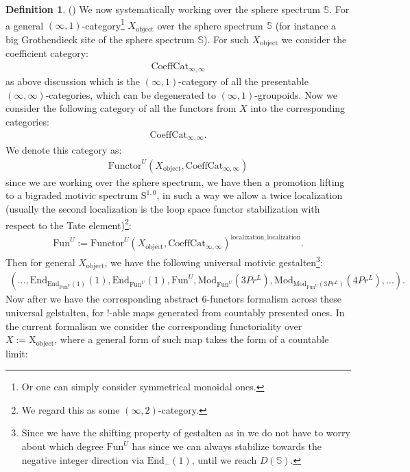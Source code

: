 \documentclass[12pt]{article}
\theoremstyle{definition}
\newtheorem{definition}{Definition}
\begin{document}
\begin{definition}()
We now systematically working over the sphere spectrum $\mathbb{S}$. For a general $(\infty,1)$-category\footnote{Or one can simply consider symmetrical monoidal ones.} $X_\mathrm{object}$ over the sphere spectrum $\mathbb{S}$ (for instance a big Grothendieck site of the sphere spectrum $\mathbb{S}$). For such $X_\mathrm{object}$ we consider the coefficient category:
\begin{align}
\mathrm{CoeffCat}_{\infty,\infty}
\end{align}
as above discussion which is the $(\infty,1)$-category of all the presentable $(\infty,\infty)$-categories, which can be degenerated to $(\infty,1)$-groupoids. Now we consider the following category of all the functors from $X$ into the corresponding categories:
\begin{align}
\mathrm{CoeffCat}_{\infty,\infty}.
\end{align}
We denote this category as:
\begin{align}
\mathrm{Functor}^U(X_\mathrm{object},\mathrm{CoeffCat}_{\infty,\infty})
\end{align}
since we are working over the sphere spectrum, we have then a promotion lifting to a bigraded motivic spectrum $\mathrm{S}^{1,0}$, in such a way we allow a twice localization (usually the second localization is the loop space functor stabilization with respect to the Tate element)\footnote{We regard this as some $(\infty,2)$-category.}:
\begin{align}
\mathrm{Fun}^U:=\mathrm{Functor}^U(X_\mathrm{object},\mathrm{CoeffCat}_{\infty,\infty})^{\mathrm{localization}, \mathrm{localization}}.
\end{align}
Then for general $X_\mathrm{object}$, we have the following universal motivic gestalten\footnote{Since we have the shifting property of gestalten as in \cite{5S5} we do not have to worry about which degree $\mathrm{Fun}^U$ has since we can always stabilize towards the negative integer direction via $\mathrm{End}_{-}(1)$, until we reach $D(\mathbb{S})$.}:
\begin{align}
(...,\mathrm{End}_{\mathrm{End}_{\mathrm{Fun}^U}(1)}(1),\mathrm{End}_{\mathrm{Fun}^U}(1),\mathrm{Fun}^U,\mathrm{Mod}_{\mathrm{Fun}^U}(3Pr^L),\mathrm{Mod}_{\mathrm{Mod}_{\mathrm{Fun}^U}(3Pr^L)}(4Pr^L),...).
\end{align}
Now after \cite{5S5} we have the corresponding abstract 6-functors formalism across these universal gelstalten, for $!$-able maps generated from countably presented ones. In the current formalism we consider the corresponding functoriality over $X:=\mathrm{X}_\mathrm{object}$, where a general form of such map takes the form of a countable limit:

\end{definition}
\end{document}
